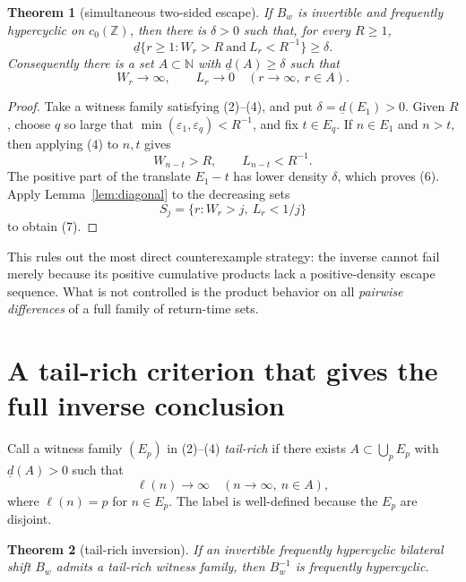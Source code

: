 \documentclass[11pt]{article}
\newtheorem{theorem}{Theorem}
\newcommand{\N}{\mathbb N}
\newcommand{\Z}{\mathbb Z}
\newcommand{\ud}{\underline d}
\begin{document}
\begin{theorem}[simultaneous two-sided escape]\label{thm:escape}
If $B_w$ is invertible and frequently hypercyclic on $c_0(\Z)$, then there is
$\delta>0$ such that, for every $R\geq1$,
\[
 \ud\{r\geq1: W_r>R\ \text{and}\ L_r<R^{-1}\}\geq\delta.             \tag{6}
\]
Consequently there is a set $A\subset\N$ with $\ud(A)\geq\delta$ such that
\[
             W_r\longrightarrow\infty,\qquad L_r\longrightarrow0
             \quad(r\to\infty,\ r\in A).                             \tag{7}
\]
\end{theorem}

\begin{proof}
Take a witness family satisfying (2)--(4), and put $\delta=\ud(E_1)>0$.
Given $R$, choose $q$ so large that
$\min(\varepsilon_1,\varepsilon_q)<R^{-1}$, and fix $t\in E_q$.  If
$n\in E_1$ and $n>t$, then applying (4) to $n,t$ gives
\[
                    W_{n-t}>R,\qquad L_{n-t}<R^{-1}.
\]
The positive part of the translate $E_1-t$ has lower density $\delta$, which
proves (6).  Apply Lemma~\ref{lem:diagonal} to the decreasing sets
\[
                    S_j=\{r:W_r>j,\ L_r<1/j\}
\]
to obtain (7).
\end{proof}

This rules out the most direct counterexample strategy: the inverse cannot
fail merely because its positive cumulative products lack a positive-density
escape sequence.  What is not controlled is the product behavior on all
\emph{pairwise differences} of a full family of return-time sets.

\section{A tail-rich criterion that gives the full inverse conclusion}

Call a witness family $(E_p)$ in (2)--(4) \emph{tail-rich} if there exists
$A\subset\bigcup_pE_p$ with $\ud(A)>0$ such that
\[
 \ell(n)\longrightarrow\infty\quad(n\to\infty,\ n\in A),              \tag{8}
\]
where $\ell(n)=p$ for $n\in E_p$.  The label is well-defined because the
$E_p$ are disjoint.

\begin{theorem}[tail-rich inversion]\label{thm:tailrich}
If an invertible frequently hypercyclic bilateral shift $B_w$ admits a
tail-rich witness family, then $B_w^{-1}$ is frequently hypercyclic.
\end{theorem}
\end{document}
